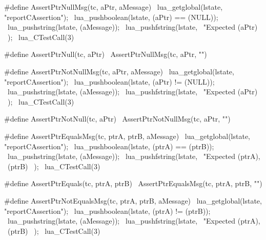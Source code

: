 \stopTestSuite

\startTestSuite[assertPrtNull]

\startCHeader
#define AssertPtrNullMsg(tc, aPtr, aMessage) \
  lua_getglobal(lstate, "reportCAssertion"); \
  lua_pushboolean(lstate, (aPtr) == (NULL)); \
  lua_pushstring(lstate, (aMessage));        \
  lua_pushfstring(lstate,                    \
      "Expected %
      (aPtr)                                 \
    );                                       \
  lua_CTestCall(3)

#define AssertPtrNull(tc, aPtr) \
  AssertPtrNullMsg(tc, aPtr, "")
\stopCHeader

\stopTestSuite

\startTestSuite[assertPtrNotNull]

\startCHeader
#define AssertPtrNotNullMsg(tc, aPtr, aMessage) \
  lua_getglobal(lstate, "reportCAssertion");    \
  lua_pushboolean(lstate, (aPtr) != (NULL));    \
  lua_pushstring(lstate, (aMessage));           \
  lua_pushfstring(lstate,                       \
      "Expected %
      (aPtr)                                    \
    );                                          \
  lua_CTestCall(3)

#define AssertPtrNotNull(tc, aPtr) \
  AssertPtrNotNullMsg(tc, aPtr, "")
\stopCHeader

\stopTestSuite

\startTestSuite[assertPtrEquals]

\startCHeader
#define AssertPtrEqualsMsg(tc, ptrA, ptrB, aMessage) \
  lua_getglobal(lstate, "reportCAssertion");         \
  lua_pushboolean(lstate, (ptrA) == (ptrB));         \
  lua_pushstring(lstate, (aMessage));                \
  lua_pushfstring(lstate,                            \
      "Expected %
      (ptrA),                                        \
      (ptrB)                                         \
    );                                               \
  lua_CTestCall(3)

#define AssertPtrEquals(tc, ptrA, ptrB) \
  AssertPtrEqualsMsg(tc, ptrA, ptrB, "")
\stopCHeader

\stopTestSuite

\startTestSuite[assertPtrNotEquals]

\startCHeader
#define AssertPtrNotEqualsMsg(tc, ptrA, ptrB, aMessage) \
  lua_getglobal(lstate, "reportCAssertion");            \
  lua_pushboolean(lstate, (ptrA) != (ptrB));            \
  lua_pushstring(lstate, (aMessage));                   \
  lua_pushfstring(lstate,                               \
      "Expected %
      (ptrA),                                           \
      (ptrB)                                            \
    );                                                  \
  lua_CTestCall(3)

